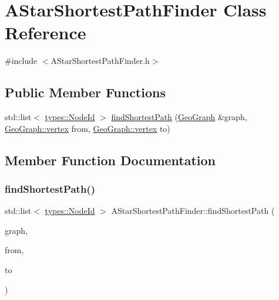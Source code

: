 \hypertarget{class_a_star_shortest_path_finder}{}\section{A\+Star\+Shortest\+Path\+Finder Class Reference}
\label{class_a_star_shortest_path_finder}


{\ttfamily \#include $<$A\+Star\+Shortest\+Path\+Finder.\+h$>$}

\subsection*{Public Member Functions}
\begin{DoxyCompactItemize}
\item 
std\+::list$<$ \mbox{\hyperlink{classtypes_1_1_node_id}{types\+::\+Node\+Id}} $>$ \mbox{\hyperlink{class_a_star_shortest_path_finder_aee370f4ee26af5f87778714e2683b9e9}{find\+Shortest\+Path}} (\mbox{\hyperlink{class_geo_graph}{Geo\+Graph}} \&graph, \mbox{\hyperlink{class_geo_graph_a24b9a457c1b212d947a891e3e12ea5d2}{Geo\+Graph\+::vertex}} from, \mbox{\hyperlink{class_geo_graph_a24b9a457c1b212d947a891e3e12ea5d2}{Geo\+Graph\+::vertex}} to)
\end{DoxyCompactItemize}


\subsection{Member Function Documentation}
\mbox{\label{class_a_star_shortest_path_finder_aee370f4ee26af5f87778714e2683b9e9}} 
\subsubsection{\texorpdfstring{findShortestPath()}{findShortestPath()}}
{\footnotesize\ttfamily std\+::list$<$ \mbox{\hyperlink{classtypes_1_1_node_id}{types\+::\+Node\+Id}} $>$ A\+Star\+Shortest\+Path\+Finder\+::find\+Shortest\+Path (\begin{DoxyParamCaption}\item[{\mbox{\hyperlink{class_geo_graph}{Geo\+Graph}} \&}]{graph,  }\item[{\mbox{\hyperlink{class_geo_graph_a24b9a457c1b212d947a891e3e12ea5d2}{Geo\+Graph\+::vertex}}}]{from,  }\item[{\mbox{\hyperlink{class_geo_graph_a24b9a457c1b212d947a891e3e12ea5d2}{Geo\+Graph\+::vertex}}}]{to }\end{DoxyParamCaption})}



